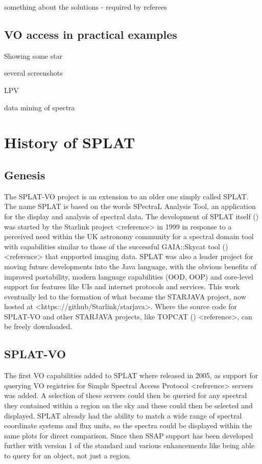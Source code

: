 \documentclass[final,authoryear,5p,times,twocolumn]{elsarticle}
\begin{document}
something about the solutions - required by referees





\subsection{VO access in practical examples}


Showing some star

several screenshots

LPV

data mining of spectra




\section{History of SPLAT}
\subsection{Genesis}

The SPLAT-VO project is an extension to an older one simply called SPLAT. The
name SPLAT is based on the words SPectraL Analysis Tool, an application for
the display and analysis of spectral data. The development of SPLAT
itself () was
started by the Starlink project <reference> in 1999 in response to a perceived
need within the UK astronomy community for a spectral domain tool with
capabilities similar to those of the successful GAIA::Skycat tool
() <reference>
that supported imaging data. SPLAT was also a leader project for moving future
developments into the Java language, with the obvious benefits of improved
portability, modern language capabilities (OOD, OOP) and core-level support for
features like UIs and internet protocols and services. This work eventually
led to the formation of what became the STARJAVA project, now hosted at
<https:://github/Starlink/starjava>. Where the source code for SPLAT-VO and
other STARJAVA projects, like TOPCAT () <reference>, can be freely downloaded.

\subsection{SPLAT-VO}
The first VO capabilities added to SPLAT where released in 2005, as support
for querying VO registries for Simple Spectral Access Protocol <reference>
servers was added. A selection of these servers could then be queried for any
spectral they contained within a region on the sky and these could then be
selected and displayed. SPLAT already had the ability to match a wide range of
spectral coordinate systems and flux units, so the spectra could be displayed
within the same plots for direct comparison. Since then SSAP support has been
developed further with version 1 of the standard and various enhancements like
being able to query for an object, not just a region.
\end{document}
